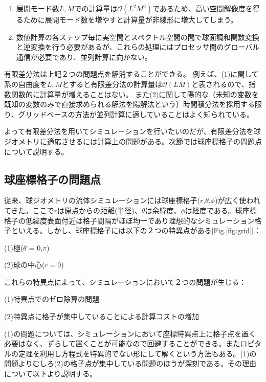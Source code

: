 \documentclass[12pt]{jsarticle}
\begin{document}
\begin{enumerate}
  \renewcommand{\labelenumi}{(\arabic{enumi})}
  \item 展開モード数$L,M$での計算量は$\mathcal{O} \left( L^2 M^2 \right)$であるため、高い空間解像度を得るために展開モード数を増やすと計算量が非線形に増大してしまう。
  \item 数値計算の各ステップ毎に実空間とスペクトル空間の間で球面調和関数変換と逆変換を行う必要があるが、これらの処理にはプロセッサ間のグローバル通信が必要であり、並列計算に向かない。
\end{enumerate}

有限差分法は上記２つの問題点を解消することができる。
例えば、(1)に関して系の自由度を$L,M$とすると有限差分法の計算量は$\mathcal{O} \left( L M \right)$と表されるので、指数関数的に計算量が増えることはない。
また(2)に関して陽的な（未知の変数を既知の変数のみで直接求められる解法を陽解法という\cite{理工学のための数値計算法}）時間積分法を採用する限り、グリッドベースの方法が並列計算に適していることはよく知られている。

よって有限差分法を用いてシミュレーションを行いたいのだが、有限差分法を球ジオメトリに適応させるには計算上の問題がある。次節では球座標格子の問題点について説明する。

\subsection{球座標格子の問題点}
従来、球ジオメトリの流体シミュレーションには球座標格子($r$,$\theta$,$\phi$)が広く使われてきた\cite{yoshimura1975model}\cite{chen2014global}。ここで$r$は原点からの距離(半径)、$\theta$は余緯度、$\phi$は経度である。球座標格子の低緯度表面付近は格子間隔がほぼ均一であり理想的なシミュレーション格子といえる。しかし、球座標格子には以下の２つの特異点がある[Fig.\ref{fig:grid}]：
\begin{description}
\item{(1)}極($\theta$ = 0,$\pi$)
\item{(2)}球の中心($r = 0$)
\end{description}
これらの特異点によって、シミュレーションにおいて２つの問題が生じる：
\begin{description}
\item{(1)}特異点でのゼロ除算の問題
\item{(2)}特異点に格子が集中していることによる計算コストの増加
\end{description}

(1)の問題については、シミュレーションにおいて座標特異点上に格子点を置く必要はなく、ずらして置くことが可能なので回避することができる\cite{kageyama1993simulation}。またロピタルの定理を利用し方程式を特異的でない形にして解くという方法もある\cite{kageyama1993simulation}。(1)の問題よりむしろ(2)の格子点が集中している問題のほうが深刻である。その理由について以下より説明する。
\end{document}
